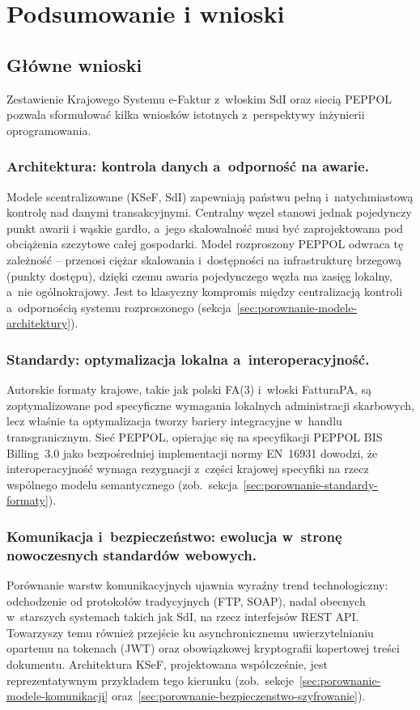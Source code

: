 \section{Podsumowanie i wnioski}
\label{sec:podsumowanie}

\subsection{Główne wnioski}
\label{sec:podsumowanie-wnioski}

Zestawienie Krajowego Systemu e-Faktur z~włoskim SdI oraz siecią PEPPOL pozwala sformułować kilka wniosków istotnych z~perspektywy inżynierii oprogramowania.

\subsubsection*{Architektura: kontrola danych a~odporność na awarie.}
Modele scentralizowane (KSeF, SdI) zapewniają państwu pełną i~natychmiastową kontrolę nad danymi transakcyjnymi. Centralny węzeł stanowi jednak pojedynczy punkt awarii i wąskie gardło, a~jego skalowalność musi być zaprojektowana pod obciążenia szczytowe całej gospodarki. Model rozproszony PEPPOL odwraca tę zależność -- przenosi ciężar skalowania i~dostępności na infrastrukturę brzegową (punkty dostępu), dzięki czemu awaria pojedynczego węzła ma zasięg lokalny, a~nie ogólnokrajowy. Jest to klasyczny kompromis między centralizacją kontroli a~odpornością systemu rozproszonego (sekcja~\ref{sec:porownanie-modele-architektury}).

\subsubsection*{Standardy: optymalizacja lokalna a~interoperacyjność.}
Autorskie formaty krajowe, takie jak polski FA(3) i~włoski FatturaPA, są zoptymalizowane pod specyficzne wymagania lokalnych administracji skarbowych, lecz właśnie ta optymalizacja tworzy bariery integracyjne w~handlu transgranicznym. Sieć PEPPOL, opierając się na specyfikacji PEPPOL BIS Billing~3.0 jako bezpośredniej implementacji normy EN~16931 dowodzi, że interoperacyjność wymaga rezygnacji z~części krajowej specyfiki na rzecz wspólnego modelu semantycznego (zob.\ sekcja~\ref{sec:porownanie-standardy-formaty}).

\subsubsection*{Komunikacja i~bezpieczeństwo: ewolucja w~stronę nowoczesnych standardów webowych.}
Porównanie warstw komunikacyjnych ujawnia wyraźny trend technologiczny: odchodzenie od protokołów tradycyjnych (FTP, SOAP), nadal obecnych w~starszych systemach takich jak SdI, na rzecz interfejsów REST API. Towarzyszy temu również przejście ku asynchronicznemu uwierzytelnianiu opartemu na tokenach (JWT) oraz obowiązkowej kryptografii kopertowej treści dokumentu. Architektura KSeF, projektowana współcześnie, jest reprezentatywnym przykładem tego kierunku (zob.\ sekcje~\ref{sec:porownanie-modele-komunikacji} oraz~\ref{sec:porownanie-bezpieczenstwo-szyfrowanie}).

